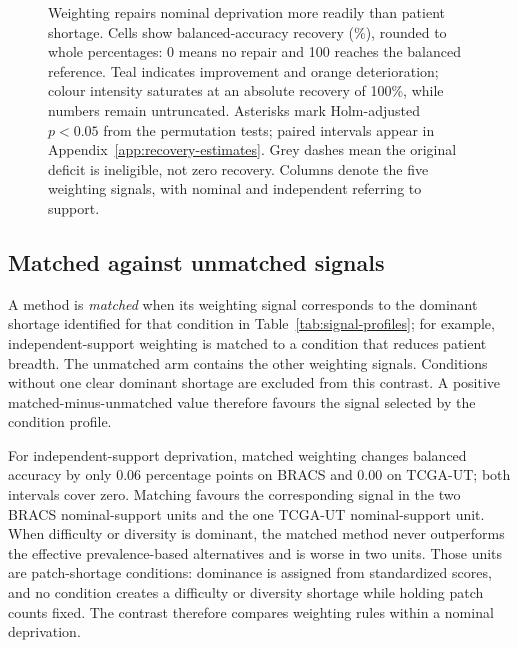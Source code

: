 \documentclass[11pt]{article}
\newcommand{\resultstable}[1]{}
\begin{document}
\begin{figure}[p]
\centering

\caption{Weighting repairs nominal deprivation more readily than patient shortage. Cells show balanced-accuracy recovery (\%), rounded to whole percentages: 0 means no repair and 100 reaches the balanced reference. Teal indicates improvement and orange deterioration; colour intensity saturates at an absolute recovery of 100\%, while numbers remain untruncated. Asterisks mark Holm-adjusted $p<0.05$ from the permutation tests; paired intervals appear in Appendix~\ref{app:recovery-estimates}. Grey dashes mean the original deficit is ineligible, not zero recovery. Columns denote the five weighting signals, with nominal and independent referring to support.}
\label{fig:recovery-overview}
\end{figure}

\subsection{Matched against unmatched signals}
\label{sec:rq2-matched}
A method is \emph{matched} when its weighting signal corresponds to the dominant shortage identified for that condition in Table~\ref{tab:signal-profiles}; for example, independent-support weighting is matched to a condition that reduces patient breadth. The unmatched arm contains the other weighting signals. Conditions without one clear dominant shortage are excluded from this contrast. A positive matched-minus-unmatched value therefore favours the signal selected by the condition profile.

\begin{table}[ht]
  \centering
  \small
  \resultstable{matched_contrast_summary}
  \caption{Matched-minus-unmatched contrasts for balanced accuracy. Intervals are paired \num{95}\% bootstrap intervals.}
  \label{tab:matched-contrast}
\end{table}

\noindent For independent-support deprivation, matched weighting changes balanced accuracy by only \num{0.06} percentage points on BRACS and \num{0.00} on TCGA-UT; both intervals cover zero. Matching favours the corresponding signal in the two BRACS nominal-support units and the one TCGA-UT nominal-support unit. When difficulty or diversity is dominant, the matched method never outperforms the effective prevalence-based alternatives and is worse in two units. Those units are patch-shortage conditions: dominance is assigned from standardized scores, and no condition creates a difficulty or diversity shortage while holding patch counts fixed. The contrast therefore compares weighting rules within a nominal deprivation.
\end{document}
